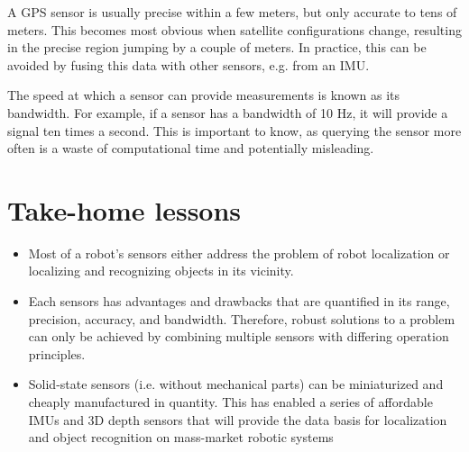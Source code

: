 A GPS sensor is usually precise within a few meters, but only accurate to tens of meters. This becomes most obvious when satellite configurations change, resulting in the precise region jumping by a couple of meters. In practice, this can be avoided by fusing this data with other sensors, e.g. from an IMU.

The speed at which a sensor can provide measurements is known as its  bandwidth. For example, if a sensor has a bandwidth of 10 Hz, it will provide a signal ten times a second. This is important to know, as querying the sensor more often is a waste of computational time and potentially misleading.


\section*{Take-home lessons}
\begin{itemize}
\item Most of a robot's sensors either address the problem of robot localization or localizing and recognizing objects in its vicinity.
\item Each sensors has advantages and drawbacks that are quantified in its range, precision, accuracy, and bandwidth. Therefore, robust solutions to a problem can only be achieved by combining multiple sensors with differing operation principles.
\item Solid-state sensors (i.e. without mechanical parts) can be miniaturized and cheaply manufactured in quantity. This has enabled a series of affordable IMUs and 3D depth sensors that will provide the data basis for localization and object recognition on mass-market robotic systems
\end{itemize} 